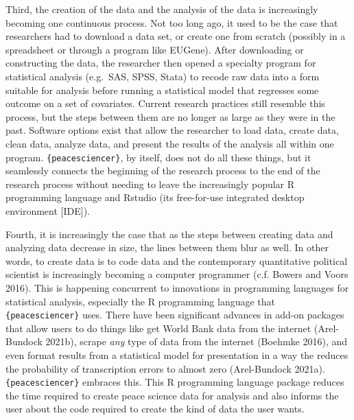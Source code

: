 \documentclass[
  11pt,
]{article}
\begin{document}
Third, the creation of the data and the analysis of the data is increasingly becoming one continuous process. Not too long ago, it used to be the case that researchers had to download a data set, or create one from scratch (possibly in a spreadsheet or through a program like EUGene). After downloading or constructing the data, the researcher then opened a specialty program for statistical analysis (e.g.~SAS, SPSS, Stata) to recode raw data into a form suitable for analysis before running a statistical model that regresses some outcome on a set of covariates. Current research practices still resemble this process, but the steps between them are no longer as large as they were in the past. Software options exist that allow the researcher to load data, create data, clean data, analyze data, and present the results of the analysis all within one program. \texttt{\{peacesciencer\}}, by itself, does not do all these things, but it seamlessly connects the beginning of the research process to the end of the research process without needing to leave the increasingly popular R programming language and Rstudio (its free-for-use integrated desktop environment {[}IDE{]}).

Fourth, it is increasingly the case that as the steps between creating data and analyzing data decrease in size, the lines between them blur as well. In other words, to create data is to code data and the contemporary quantitative political scientist is increasingly becoming a computer programmer (c.f. Bowers and Voors 2016). This is happening concurrent to innovations in programming languages for statistical analysis, especially the R programming language that \texttt{\{peacesciencer\}} uses. There have been significant advances in add-on packages that allow users to do things like get World Bank data from the internet (Arel-Bundock 2021b), scrape \emph{any} type of data from the internet (Boehmke 2016), and even format results from a statistical model for presentation in a way the reduces the probability of transcription errors to almost zero (Arel-Bundock 2021a). \texttt{\{peacesciencer\}} embraces this. This R programming language package reduces the time required to create peace science data for analysis and also informs the user about the code required to create the kind of data the user wants.
\end{document}

